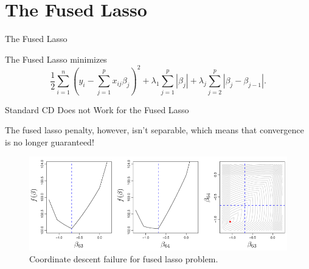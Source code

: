 \documentclass[10pt,ignorenonframetext]{beamer}
\begin{document}
\section{The Fused Lasso}

\begin{frame}{The Fused Lasso}

The Fused Lasso minimizes
\[
\frac 12 \sum_{i=1}^n \left( y_i - \sum_{j=1}^px_{ij}\beta_j\right)^2 + \lambda_1 \sum_{j=1}^p|\beta_j| + \lambda_j \sum_{j=2}^p |\beta_j - \beta_{j-1}|.
\]

\begin{figure}
    \centering
    \pgfplotsset{width=6cm,height=6cm}
    
\end{figure}

\end{frame}


\begin{frame}{Standard CD Does not Work for the Fused Lasso}

The fused lasso penalty, however, isn't \alert{separable}, which means that convergence is no longer guaranteed!

\begin{figure}
    \centering
    \includegraphics[width=\linewidth]{figures/fused-lasso-failure.png}
    \caption{Coordinate descent failure for fused lasso problem.}
\end{figure}

\end{frame}
\end{document}
